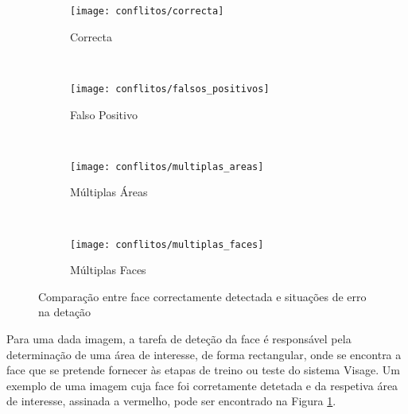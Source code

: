 \begin{figure}[t]
        \centering
        \begin{subfigure}[b]{0.2\textwidth}
                \centering
                \texttt{[image: conflitos/correcta]}
                \caption{Correcta}
                \label{fig:conflitos-correcta}
        \end{subfigure}%
        ~ 
        \begin{subfigure}[b]{0.2\textwidth}
                \centering
                \texttt{[image: conflitos/falsos\_positivos]}
                \caption{Falso Positivo}
                \label{fig:conflitos-falsos_positivos}
        \end{subfigure}
        ~ 
        \begin{subfigure}[b]{0.2\textwidth}
                \centering
                \texttt{[image: conflitos/multiplas\_areas]}
                \caption{Múltiplas Áreas}
                \label{fig:conflitos-multiplas_areas}
        \end{subfigure}
        ~ 
        \begin{subfigure}[b]{0.2\textwidth}
                \centering
                \texttt{[image: conflitos/multiplas\_faces]}
                \caption{Múltiplas Faces}
                \label{fig:conflitos-multiplas_faces}
        \end{subfigure}
        \caption{Comparação entre face correctamente detectada e situações de erro na detação}\label{fig:conflitos-detecao}
\end{figure}

Para uma dada imagem, a tarefa de deteção da face é responsável pela determinação de uma área de interesse, de forma rectangular, onde se encontra a face que se pretende fornecer às etapas de treino ou teste do sistema Visage. Um exemplo de uma imagem cuja face foi corretamente detetada e da respetiva área de interesse, assinada a vermelho, pode ser encontrado na Figura \ref{fig:conflitos-correcta}.

